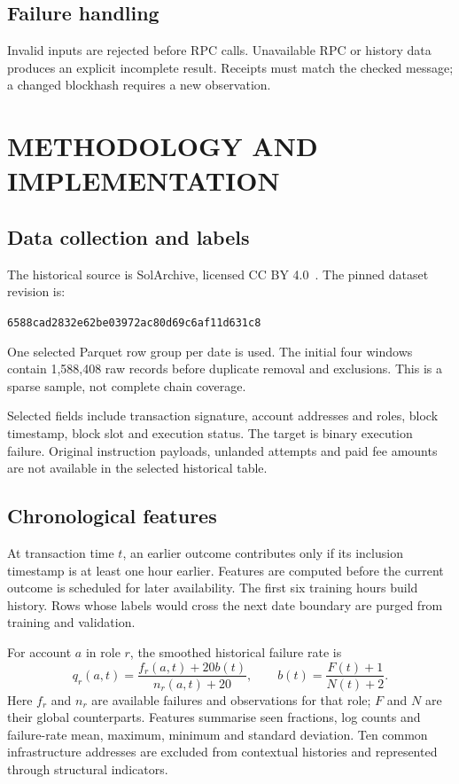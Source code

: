 \documentclass[12pt,a4paper,oneside]{report}
\begin{document}
\section{Failure handling}
Invalid inputs are rejected before RPC calls. Unavailable RPC or history data produces an explicit incomplete result. Receipts must match the checked message; a changed blockhash requires a new observation.

\chapter{METHODOLOGY AND IMPLEMENTATION}
\section{Data collection and labels}
The historical source is SolArchive, licensed CC BY 4.0~\cite{archive}. The pinned dataset revision is:\par
{\small\texttt{6588cad2832e62be03972ac80d69c6af11d631c8}}\par
 One selected Parquet row group per date is used. The initial four windows contain 1,588,408 raw records before duplicate removal and exclusions. This is a sparse sample, not complete chain coverage.

Selected fields include transaction signature, account addresses and roles, block timestamp, block slot and execution status. The target is binary execution failure. Original instruction payloads, unlanded attempts and paid fee amounts are not available in the selected historical table.
\section{Chronological features}
At transaction time $t$, an earlier outcome contributes only if its inclusion timestamp is at least one hour earlier. Features are computed before the current outcome is scheduled for later availability. The first six training hours build history. Rows whose labels would cross the next date boundary are purged from training and validation.

For account $a$ in role $r$, the smoothed historical failure rate is
\begin{equation}q_r(a,t)=\frac{f_r(a,t)+20b(t)}{n_r(a,t)+20},\qquad b(t)=\frac{F(t)+1}{N(t)+2}.\end{equation}
Here $f_r$ and $n_r$ are available failures and observations for that role; $F$ and $N$ are their global counterparts. Features summarise seen fractions, log counts and failure-rate mean, maximum, minimum and standard deviation. Ten common infrastructure addresses are excluded from contextual histories and represented through structural indicators.
\end{document}
